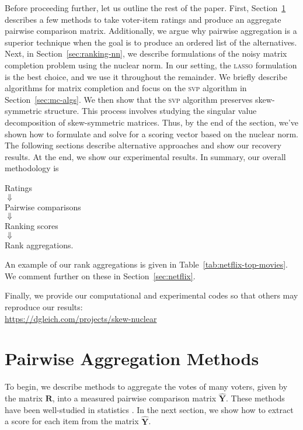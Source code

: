 \documentclass{sig-alternate}
\renewcommand{\cite}{\citep}
\newcommand{\algo}[1]{\textsc{\lowercase{#1}}}
\newcommand{\mat}{\boldsymbol}
\renewcommand{\vec}[1]{\boldsymbol{\mathrm{#1}}}
\providecommand{\mYhat}{\ensuremath{\mat{\hat{\mY}}}}
\providecommand{\mR}{\ensuremath{\mat{R}}}
\providecommand{\mY}{\ensuremath{\mat{Y}}}
\providecommand{\vs}{\ensuremath{\vec{s}}}
\begin{document}
Before proceeding further, let us outline the rest of the paper.
First, Section~\ref{sec:pairwise} describes a few 
methods to take voter-item ratings and produce an aggregate 
pairwise comparison matrix.  Additionally, we argue 
why pairwise aggregation is
a superior technique when the goal is to produce
an ordered list of the alternatives.  
Next, in Section~\ref{sec:ranking-nn}, we describe  
formulations of the noisy matrix completion problem 
using the nuclear norm.
In our setting, the 
\algo{lasso} formulation is the best choice, and we use
it throughout the remainder.  We 
briefly describe algorithms for matrix completion and focus
on the \algo{svp} algorithm  \cite{Jain-2010-SVP} 
in Section~\ref{sec:mc-algs}.
We then show that the \algo{svp} algorithm preserves skew-symmetric structure.
This process
involves studying the singular value decomposition of skew-symmetric
matrices.  Thus, by the end of the section, we've shown how to
formulate and solve for a scoring vector based on the nuclear norm.
The following sections describe alternative approaches and show our
recovery results.  At the end, we show our experimental results.
In summary, our overall methodology is 
\begin{center}
Ratings \rlap{($= \mR$)} \\
$\Downarrow$ \rlap{(\S \ref{sec:pairwise})}\\
 Pairwise comparisons \rlap{($= \mY$)}\\
$\Downarrow$ \rlap{(\S \ref{sec:ranking-nn})}\\
Ranking scores \rlap{($= \vs$)} \\
$\Downarrow$  \\
Rank aggregations.
\end{center}
An example of our rank aggregations 
is given in Table~\ref{tab:netflix-top-movies}.  We comment
further on these in Section~\ref{sec:netflix}.

Finally, we provide our computational and experimental
codes so that others may reproduce our results:\\
\url{https://dgleich.com/projects/skew-nuclear}



\section{Pairwise Aggregation Methods}
\label{sec:pairwise}

To begin, we describe methods to aggregate the votes
of many voters, given by the matrix $\mR$, 
into a measured pairwise comparison matrix $\mYhat$.  
These methods have been well-studied in statistics
\cite{david1988-paired}.
In the next
section, we show how to extract a score for each item from the 
matrix $\mYhat$.
\end{document}
